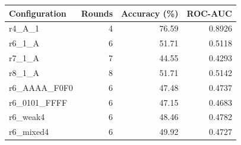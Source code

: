 \begin{tabular}{lrrr}
Configuration & Rounds & Accuracy (\%) & ROC-AUC \\
\hline
r4\_A\_1 & 4 & 76.59 & 0.8926 \\
r6\_1\_A & 6 & 51.71 & 0.5118 \\
r7\_1\_A & 7 & 44.55 & 0.4293 \\
r8\_1\_A & 8 & 51.71 & 0.5142 \\
r6\_AAAA\_F0F0 & 6 & 47.48 & 0.4737 \\
r6\_0101\_FFFF & 6 & 47.15 & 0.4683 \\
r6\_weak4 & 6 & 48.46 & 0.4782 \\
r6\_mixed4 & 6 & 49.92 & 0.4727 \\
\end{tabular}
